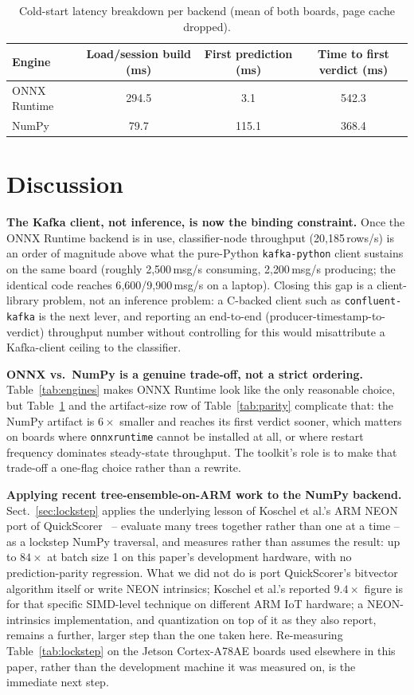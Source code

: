 \documentclass[runningheads]{llncs}
\begin{document}
\begin{table}[htbp]
  \caption{Cold-start latency breakdown per backend (mean of both boards, page cache dropped).}
  \label{tab:coldstart}
  \centering
  \small
  \begin{tabular}{l c c c}
    \toprule
    Engine & Load/session build (ms) & First prediction (ms) & Time to first verdict (ms) \\
    \midrule
    ONNX Runtime & 294.5 & 3.1 & 542.3 \\
    NumPy        & 79.7  & 115.1 & 368.4 \\
    \bottomrule
  \end{tabular}
\end{table}

\section{Discussion}
\label{sec:discussion}

\textbf{The Kafka client, not inference, is now the binding constraint.} Once the ONNX Runtime backend is in use, classifier-node throughput (20{,}185\,rows/s) is an order of magnitude above what the pure-Python \texttt{kafka-python} client sustains on the same board (roughly 2{,}500\,msg/s consuming, 2{,}200\,msg/s producing; the identical code reaches 6{,}600/9{,}900\,msg/s on a laptop). Closing this gap is a client-library problem, not an inference problem: a C-backed client such as \texttt{confluent-kafka} is the next lever, and reporting an end-to-end (producer-timestamp-to-verdict) throughput number without controlling for this would misattribute a Kafka-client ceiling to the classifier.

\textbf{ONNX vs.\ NumPy is a genuine trade-off, not a strict ordering.} Table~\ref{tab:engines} makes ONNX Runtime look like the only reasonable choice, but Table~\ref{tab:coldstart} and the artifact-size row of Table~\ref{tab:parity} complicate that: the NumPy artifact is $6\times$ smaller and reaches its first verdict sooner, which matters on boards where \texttt{onnxruntime} cannot be installed at all, or where restart frequency dominates steady-state throughput. The toolkit's role is to make that trade-off a one-flag choice rather than a rewrite.

\textbf{Applying recent tree-ensemble-on-ARM work to the NumPy backend.} Sect.~\ref{sec:lockstep} applies the underlying lesson of Koschel et al.'s ARM NEON port of QuickScorer~\cite{koschel2023arm} -- evaluate many trees together rather than one at a time -- as a lockstep NumPy traversal, and measures rather than assumes the result: up to $84\times$ at batch size 1 on this paper's development hardware, with no prediction-parity regression. What we did not do is port QuickScorer's bitvector algorithm itself or write NEON intrinsics; Koschel et al.'s reported $9.4\times$ figure is for that specific SIMD-level technique on different ARM IoT hardware; a NEON-intrinsics implementation, and quantization on top of it as they also report, remains a further, larger step than the one taken here. Re-measuring Table~\ref{tab:lockstep} on the Jetson Cortex-A78AE boards used elsewhere in this paper, rather than the development machine it was measured on, is the immediate next step.
\end{document}
